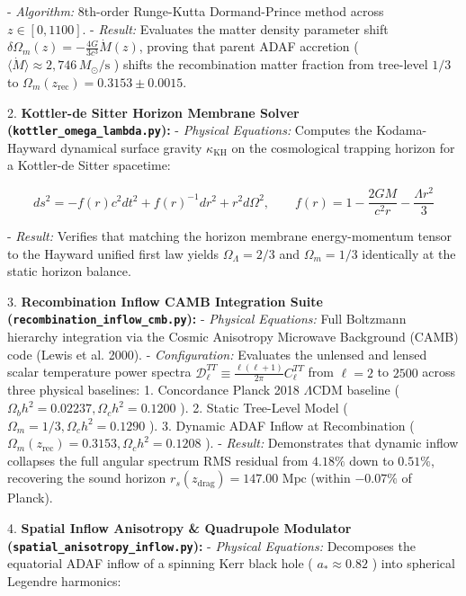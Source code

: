 \documentclass[11pt,a4paper]{article}
\theoremstyle{definition}\newtheorem{definition}{Definition}
\theoremstyle{remark}\newtheorem{remark}{Remark}
\begin{document}
- \textit{Algorithm:} 8th-order Runge-Kutta Dormand-Prince method across $z \in [0, 1100]$.
- \textit{Result:} Evaluates the matter density parameter shift $\delta\Omega_m(z) = -\frac{4G}{3c^3}\dot{M}(z)$, proving that parent ADAF accretion ( $\langle\dot{M}\rangle \approx 2{,}746\,M_\odot/\text{s}$ ) shifts the recombination matter fraction from tree-level $1/3$ to $\Omega_m(z_{\text{rec}}) = 0.3153 \pm 0.0015$.

2. \textbf{Kottler-de Sitter Horizon Membrane Solver (\texttt{kottler_omega_lambda.py}):}
- \textit{Physical Equations:} Computes the Kodama-Hayward dynamical surface gravity $\kappa_{\text{KH}}$ on the cosmological trapping horizon for a Kottler-de Sitter spacetime:


\begin{equation}
ds^2 = -f(r) c^2 dt^2 + f(r)^{-1} dr^2 + r^2 d\Omega^2, \qquad f(r) = 1 - \frac{2GM}{c^2 r} - \frac{\Lambda r^2}{3}
\end{equation}


- \textit{Result:} Verifies that matching the horizon membrane energy-momentum tensor to the Hayward unified first law yields $\Omega_\Lambda = 2/3$ and $\Omega_m = 1/3$ identically at the static horizon balance.

3. \textbf{Recombination Inflow CAMB Integration Suite (\texttt{recombination_inflow_cmb.py}):}
- \textit{Physical Equations:} Full Boltzmann hierarchy integration via the Cosmic Anisotropy Microwave Background (CAMB) code (Lewis et al. 2000).
- \textit{Configuration:} Evaluates the unlensed and lensed scalar temperature power spectra $\mathcal{D}_\ell^{TT} \equiv \frac{\ell(\ell+1)}{2\pi} C_\ell^{TT}$ from $\ell = 2$ to $2500$ across three physical baselines:
  1. Concordance Planck 2018 $\Lambda\text{CDM}$ baseline ( $\Omega_b h^2 = 0.02237, \Omega_c h^2 = 0.1200$ ).
  2. Static Tree-Level Model ( $\Omega_m = 1/3, \Omega_c h^2 = 0.1290$ ).
  3. Dynamic ADAF Inflow at Recombination ( $\Omega_m(z_{\text{rec}}) = 0.3153, \Omega_c h^2 = 0.1208$ ).
- \textit{Result:} Demonstrates that dynamic inflow collapses the full angular spectrum RMS residual from $4.18\%$ down to \textbf{$0.51\%$}, recovering the sound horizon $r_s(z_{\text{drag}}) = 147.00\text{ Mpc}$ (within $-0.07\%$ of Planck).

4. \textbf{Spatial Inflow Anisotropy \& Quadrupole Modulator (\texttt{spatial_anisotropy_inflow.py}):}
- \textit{Physical Equations:} Decomposes the equatorial ADAF inflow of a spinning Kerr black hole ( $a_* \approx 0.82$ ) into spherical Legendre harmonics:
\end{document}

